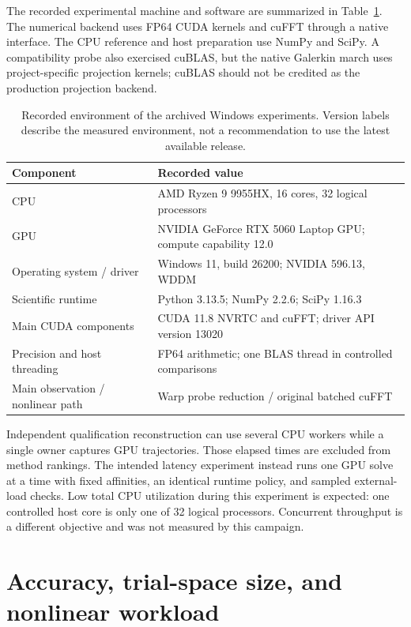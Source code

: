 The recorded experimental machine and software are summarized in Table~\ref{tab:hardware}. The numerical backend uses FP64 CUDA kernels and cuFFT through a native interface. The CPU reference and host preparation use NumPy and SciPy. A compatibility probe also exercised cuBLAS, but the native Galerkin march uses project-specific projection kernels; cuBLAS should not be credited as the production projection backend.

\begin{table}[tbp]
\centering\small
\caption{Recorded environment of the archived Windows experiments. Version labels describe the measured environment, not a recommendation to use the latest available release.}
\label{tab:hardware}
\begin{tabularx}{\linewidth}{@{}lX@{}}
\toprule
Component & Recorded value \\
\midrule
CPU & AMD Ryzen 9 9955HX, 16 cores, 32 logical processors \\
GPU & NVIDIA GeForce RTX 5060 Laptop GPU; compute capability 12.0 \\
Operating system / driver & Windows 11, build 26200; NVIDIA 596.13, WDDM \\
Scientific runtime & Python 3.13.5; NumPy 2.2.6; SciPy 1.16.3 \\
Main CUDA components & CUDA 11.8 NVRTC and cuFFT; driver API version 13020 \\
Precision and host threading & FP64 arithmetic; one BLAS thread in controlled comparisons \\
Main observation / nonlinear path & Warp probe reduction / original batched cuFFT \\
\bottomrule
\end{tabularx}
\end{table}

Independent qualification reconstruction can use several CPU workers while a single owner captures GPU trajectories. Those elapsed times are excluded from method rankings. The intended latency experiment instead runs one GPU solve at a time with fixed affinities, an identical runtime policy, and sampled external-load checks. Low total CPU utilization during this experiment is expected: one controlled host core is only one of 32 logical processors. Concurrent throughput is a different objective and was not measured by this campaign.

\section{Accuracy, trial-space size, and nonlinear workload}
\label{sec:accuracy-results}

